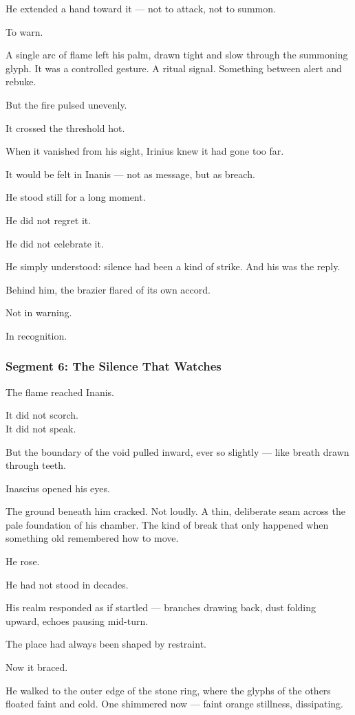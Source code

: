 \documentclass[9pt]{article}
\begin{document}
He extended a hand toward it — not to attack, not to summon.

To warn.

A single arc of flame left his palm, drawn tight and slow through the summoning glyph. It was a controlled gesture. A ritual signal. Something between alert and rebuke.

But the fire pulsed unevenly.

It crossed the threshold hot.

When it vanished from his sight, Irinius knew it had gone too far.

It would be felt in Inanis — not as message, but as breach.

He stood still for a long moment.

He did not regret it.

He did not celebrate it.

He simply understood: silence had been a kind of strike. And his was the reply.

Behind him, the brazier flared of its own accord.

Not in warning.

In recognition.

\newpage

\subsubsection*{Segment 6: The Silence That Watches}

The flame reached Inanis.

It did not scorch.\\
It did not speak.

But the boundary of the void pulled inward, ever so slightly — like breath drawn through teeth.

Inascius opened his eyes.

The ground beneath him cracked. Not loudly. A thin, deliberate seam across the pale foundation of his chamber. The kind of break that only happened when something old remembered how to move.

He rose.

He had not stood in decades.

His realm responded as if startled — branches drawing back, dust folding upward, echoes pausing mid-turn.

The place had always been shaped by restraint.

Now it braced.

He walked to the outer edge of the stone ring, where the glyphs of the others floated faint and cold. One shimmered now — faint orange stillness, dissipating.
\end{document}
